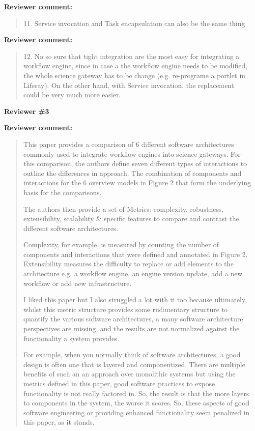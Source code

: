 \documentclass[a4]{letter}
\newenvironment{review}%
{\textbf{Reviewer comment:}\begin{quote}}%
{\end{quote}}%
\begin{document}
\begin{letter}{}
\begin{review}
  11. Service invocation and Task encapsulation can also be the same
  thing
\end{review}

\begin{review}
12. No so sure that tight integration are the most easy for
integrating a workflow engine, since in case a the workflow engine
needs to be modified, the whole science gateway has to be change
(e.g. re-programe a portlet in Liferay). On the other hand, with
Service invocation, the replacement could be very much more easier.
\end{review}

\textbf{Reviewer \#3}

\begin{review}
This paper provides a comparison of 6 different software architectures commonly used to integrate workflow engines into science gateways. For this comparison, the authors define seven different types of interactions to outline the differences in approach. The combination of components and interactions for the 6 overview models in Figure 2 that form the underlying basis for the comparisons.

The authors then provide a set of Metrics: complexity, robustness, extensibility, scalability \& specific features to compare and contrast the different software architectures.

Complexity, for example, is measured by counting the number of components and interactions that were defined and annotated in Figure 2.  Extensibility measures the difficulty to replace or add elements to the architecture e.g. a workflow engine, an engine version update, add a new workflow or add new infrastructure. 

I liked this paper but I also struggled a lot with it too because ultimately, whilst this metric structure provides some rudimentary structure to quantify the various software architectures, a many software architecture perspectives are missing, and the results are not normalized against the functionality a system provides.

For example, when you normally think of software architectures, a good design is often one that is layered and componentized. There are multiple benefits of such an an approach over monolithic systems but using the metrics defined in this paper, good software practices to expose functionality is not really factored in. So, the result is that the more layers to components in the system, the worse it scores. So, these aspects of good software engineering or providing enhanced functionality seem penalized in this paper, as it stands. 
\end{review}


\end{letter}
\end{document}
